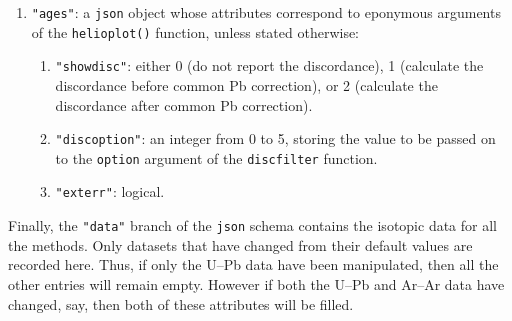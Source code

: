 \begin{refsection}
\begin{enumerate}[leftmargin=\parindent,align=left,
      labelwidth=\parindent,label*=2.\arabic*.]
\begin{enumerate}[leftmargin=\parindent,align=left,
      labelwidth=\parindent,label*=\arabic*.]
        colour specification (e.g. \texttt{"red"}, \texttt{rgb(1,0,0)}
        or \texttt{\#FF0000}).
    \item{\tt "model"}: an integer between 1 and 3.
    \item{\tt "clabel"}: a text string.
  \end{enumerate}
\item{\tt "ages"}: a \texttt{json} object whose attributes
  correspond to eponymous arguments of the \texttt{helioplot()}
  function, unless stated otherwise:
  \begin{enumerate}[leftmargin=\parindent,align=left,
      labelwidth=\parindent,label*=\arabic*.]
    \item{\tt "showdisc"}: either 0 (do not report the discordance), 1
      (calculate the discordance before common Pb correction), or 2
      (calculate the discordance after common Pb correction).
    \item{\tt "discoption"}: an integer from 0 to 5, storing the value
      to be passed on to the \texttt{option} argument of the
      \texttt{discfilter} function.
    \item{\tt "exterr"}: logical.
  \end{enumerate}
\end{enumerate}

Finally, the \texttt{"data"} branch of the \texttt{json} schema
contains the isotopic data for all the methods. Only datasets that
have changed from their default values are recorded here. Thus, if
only the U--Pb data have been manipulated, then all the other entries
will remain empty. However if both the U--Pb and Ar--Ar data have
changed, say, then both of these attributes will be filled.


\end{refsection}
